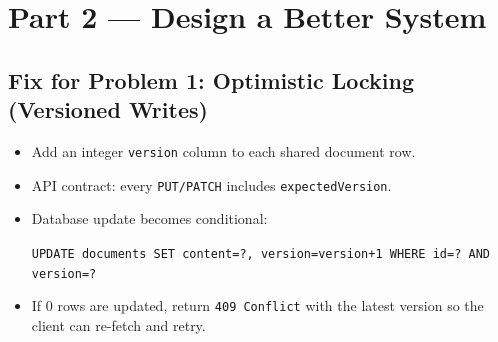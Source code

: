 \documentclass[11pt]{article}
\begin{document}
\section*{Part 2 --- Design a Better System}

\subsection*{Fix for Problem 1: Optimistic Locking (Versioned Writes)}
\begin{itemize}
  \item Add an integer \texttt{version} column to each shared document row.
  \item API contract: every \texttt{PUT/PATCH} includes \texttt{expectedVersion}.
  \item Database update becomes conditional:
  \begin{center}
    \texttt{UPDATE documents SET content=?, version=version+1 WHERE id=? AND version=?}
  \end{center}
  \item If 0 rows are updated, return \texttt{409 Conflict} with the latest version so the client can re-fetch and retry.
\end{itemize}
\end{document}
